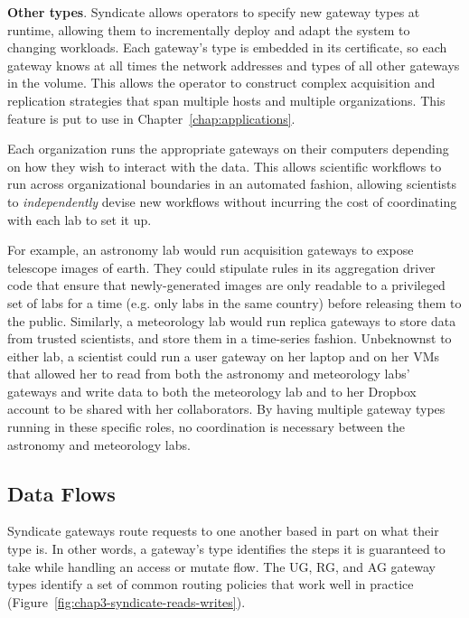\textbf{Other types}.  Syndicate allows operators to specify new gateway types at runtime, allowing
them to incrementally deploy and adapt the system to changing workloads.  Each
gateway's type is embedded in its certificate, so each gateway knows at all
times the network addresses and types of all other gateways in the volume.
This allows the operator to construct complex acquisition and replication
strategies that span multiple hosts and multiple organizations.
This feature is put to use in Chapter~\ref{chap:applications}.

Each organization runs the appropriate gateways on their computers depending on
how they wish to interact with the data.  This allows scientific workflows to
run across organizational boundaries in an automated fashion, allowing
scientists to \emph{independently} devise new workflows without incurring the
cost of coordinating with each lab to set it up.

For example, an astronomy lab would
run acquisition gateways to expose telescope images of earth.  They could stipulate rules
in its aggregation driver code that ensure that newly-generated images are only
readable to a privileged set of labs for a time (e.g. only labs in the same
country) before releasing them to the public.  Similarly, a meteorology
lab would run replica gateways to store data from trusted scientists, and
store them in a time-series fashion.  Unbeknownst to either lab, a scientist could
run a user gateway on her laptop and on her VMs that allowed her to read from both the
astronomy and meteorology labs' gateways and write data to both the meteorology
lab and to her Dropbox account to be shared with her collaborators.  By having
multiple gateway types running in these specific roles, no coordination is
necessary between the astronomy and meteorology labs.

\subsection{Data Flows}

Syndicate gateways route requests to one another based in part on what their
type is.  In other words, a gateway's type identifies the steps it is guaranteed
to take while handling an access or mutate flow.
The UG, RG, and AG gateway types identify a set of common routing policies that
work well in practice
(Figure~\ref{fig:chap3-syndicate-reads-writes}).

